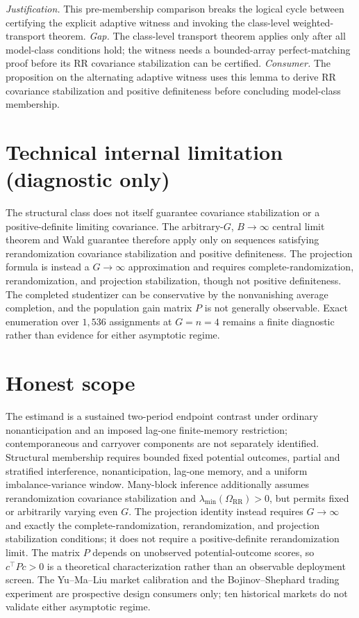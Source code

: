 \documentclass{article}
\begin{document}
\par\smallskip\noindent \textit{Justification.} This pre-membership comparison breaks the logical cycle between certifying the explicit adaptive witness and invoking the class-level weighted-transport theorem. \textit{Gap.} The class-level transport theorem applies only after all model-class conditions hold; the witness needs a bounded-array perfect-matching proof before its RR covariance stabilization can be certified. \textit{Consumer.} The proposition on the alternating adaptive witness uses this lemma to derive RR covariance stabilization and positive definiteness before concluding model-class membership.

\section*{Technical internal limitation (diagnostic only)}

The structural class does not itself guarantee covariance stabilization or a positive-definite limiting covariance.  The arbitrary-\(G\), \(B\to\infty\) central limit theorem and Wald guarantee therefore apply only on sequences satisfying rerandomization covariance stabilization and positive definiteness.  The projection formula is instead a \(G\to\infty\) approximation and requires complete-randomization, rerandomization, and projection stabilization, though not positive definiteness.  The completed studentizer can be conservative by the nonvanishing average completion, and the population gain matrix \(P\) is not generally observable.  Exact enumeration over \(1{,}536\) assignments at \(G=n=4\) remains a finite diagnostic rather than evidence for either asymptotic regime.

\section{Honest scope}

The estimand is a sustained two-period endpoint contrast under ordinary nonanticipation and an imposed lag-one finite-memory restriction; contemporaneous and carryover components are not separately identified.  Structural membership requires bounded fixed potential outcomes, partial and stratified interference, nonanticipation, lag-one memory, and a uniform imbalance-variance window.  Many-block inference additionally assumes rerandomization covariance stabilization and \(\lambda_{\min}(\Omega_{\mathrm{RR}})>0\), but permits fixed or arbitrarily varying even \(G\).  The projection identity instead requires \(G\to\infty\) and exactly the complete-randomization, rerandomization, and projection stabilization conditions; it does not require a positive-definite rerandomization limit.  The matrix \(P\) depends on unobserved potential-outcome scores, so \(c^\top Pc>0\) is a theoretical characterization rather than an observable deployment screen.  The Yu--Ma--Liu market calibration and the Bojinov--Shephard trading experiment are prospective design consumers only; ten historical markets do not validate either asymptotic regime.
\end{document}
